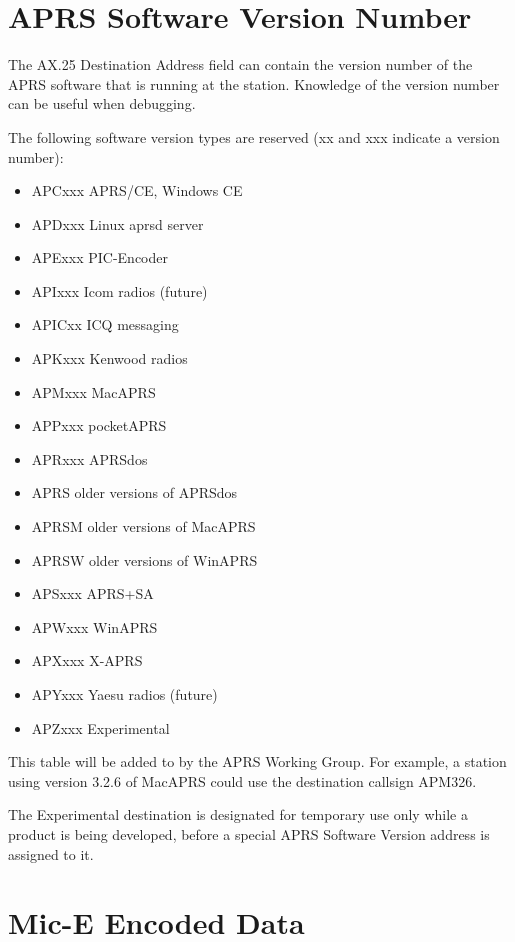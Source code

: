 \section{APRS Software Version Number}

The AX.25 Destination Address field can contain the version number of the
APRS software that is running at the station. Knowledge of the version
number can be useful when debugging.

The following software version types are reserved (xx and xxx indicate a
version number):

\begin{itemize}

\item APCxxx APRS/CE, Windows CE
\item APDxxx Linux aprsd server
\item APExxx PIC-Encoder
\item APIxxx Icom radios (future)
\item APICxx ICQ messaging
\item APKxxx Kenwood radios
\item APMxxx MacAPRS
\item APPxxx pocketAPRS
\item APRxxx APRSdos
\item APRS older versions of APRSdos
\item APRSM older versions of MacAPRS
\item APRSW older versions of WinAPRS
\item APSxxx APRS+SA
\item APWxxx WinAPRS
\item APXxxx X-APRS
\item APYxxx Yaesu radios (future)
\item APZxxx Experimental

\end{itemize}

This table will be added to by the APRS Working Group.
For example, a station using version 3.2.6 of MacAPRS could use the
destination callsign \textsf{APM326}.

The Experimental destination is designated for temporary use only while a
product is being developed, before a special APRS Software Version address
is assigned to it.

\section {Mic-E Encoded Data}

